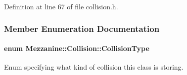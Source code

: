 Definition at line 67 of file collision.h.



\subsubsection{Member Enumeration Documentation}
\hypertarget{classMezzanine_1_1Collision_aacdbb06153734d3645f4c806dbf90153}{
\paragraph[{CollisionType}]{\setlength{\rightskip}{0pt plus 5cm}enum {\bf Mezzanine::Collision::CollisionType}}\hfill}
\label{classMezzanine_1_1Collision_aacdbb06153734d3645f4c806dbf90153}


Enum specifying what kind of collision this class is storing. 

